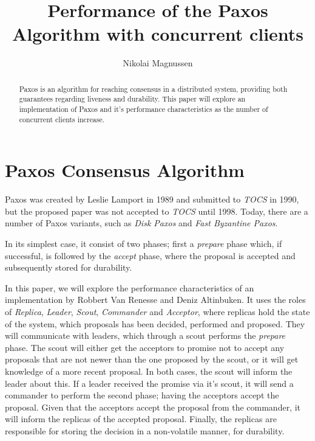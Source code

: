 \documentclass[conference]{IEEEtran}
\title{Performance of the Paxos Algorithm  with concurrent clients}
\author{Nikolai Magnussen}
\begin{document}
\maketitle

\begin{abstract}
Paxos is an algorithm for reaching consensus in a distributed system, providing both guarantees regarding liveness and durability\cite{simple}.
This paper will explore an implementation of Paxos and it's performance characteristics as the number of concurrent clients increase.

\end{abstract}

\section{Paxos Consensus Algorithm}
Paxos was created by Leslie Lamport in 1989 and submitted to \textit{TOCS} in 1990\cite{Lamport:Internet}, but the proposed paper was not accepted to \textit{TOCS} until 1998\cite{Lamport:1998:PP:279227.279229}.
Today, there are a number of Paxos variants, such as \textit{Disk Paxos}\cite{disk-paxos} and \textit{Fast Byzantine Paxos}\cite{byzantine-paxos}.

In its simplest case, it consist of two phases; first a \textit{prepare} phase which, if successful, is followed by the \textit{accept} phase, where the proposal is accepted and subsequently stored for durability.

In this paper, we will explore the performance characteristics of an implementation by Robbert Van Renesse and Deniz Altinbuken\cite{moderately}.
It uses the roles of \textit{Replica}, \textit{Leader}, \textit{Scout}, \textit{Commander} and \textit{Acceptor}, where replicas hold the state of the system, which proposals has been decided, performed and proposed.
They will communicate with leaders, which through a scout performs the \textit{prepare} phase.
The scout will either get the acceptors to promise not to accept any proposals that are not newer than the one proposed by the scout, or it will get knowledge of a more recent proposal. In both cases, the scout will inform the leader about this.
If a leader received the promise via it's scout, it will send a commander to perform the second phase; having the acceptors accept the proposal.
Given that the acceptors accept the proposal from the commander, it will inform the replicas of the accepted proposal.
Finally, the replicas are responsible for storing the decision in a non-volatile manner, for durability.
\end{document}
